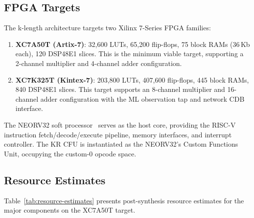 \documentclass[11pt,a4paper]{article}
\begin{document}
\subsection{FPGA Targets}
\label{sec:fpga-targets}

The k-length architecture targets two Xilinx 7-Series FPGA families:

\begin{enumerate}[leftmargin=*]
  \item \textbf{XC7A50T (Artix-7)}: 32,600 LUTs, 65,200 flip-flops, 75
    block RAMs (36\,Kb each), 120 DSP48E1 slices.  This is the minimum
    viable target, supporting a 2-channel multiplier and 4-channel adder
    configuration.

  \item \textbf{XC7K325T (Kintex-7)}: 203,800 LUTs, 407,600 flip-flops,
    445 block RAMs, 840 DSP48E1 slices.  This target supports an 8-channel
    multiplier and 16-channel adder configuration with the ML observation
    tap and network CDB interface.
\end{enumerate}

The NEORV32 soft processor~\cite{neorv32ref} serves as the host core,
providing the RISC-V instruction fetch/decode/execute pipeline, memory
interfaces, and interrupt controller.  The KR CFU is instantiated as the
NEORV32's Custom Functions Unit, occupying the custom-0 opcode space.

\subsection{Resource Estimates}
\label{sec:resource-estimates}

Table~\ref{tab:resource-estimates} presents post-synthesis resource estimates
for the major components on the XC7A50T target.
\end{document}
